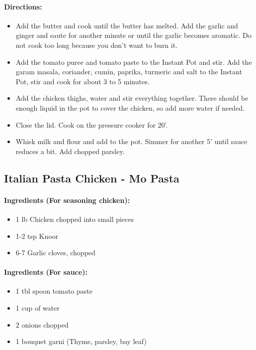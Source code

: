 \documentclass{article}
\begin{document}
\paragraph{Directions:}
\begin{itemize}
    \item Add the butter and cook until the butter has melted. Add the garlic and ginger and saute for another minute or until the garlic becomes aromatic. Do not cook too long because you don’t want to burn it.
    \item Add the tomato puree and tomato paste to the Instant Pot and stir. Add the garam masala, coriander, cumin, paprika, turmeric and salt to the Instant Pot, stir and cook for about 3 to 5 minutes.
    \item Add the chicken thighs, water and stir everything together. There should be enough liquid in the pot to cover the chicken, so add more water if needed.
    \item Close the lid. Cook on the pressure cooker for 20’.
    \item Whisk milk and flour and add to the pot. Simmer for another 5’ until sauce reduces a bit. Add chopped parsley.
\end{itemize}

\subsection{Italian Pasta Chicken - Mo Pasta} 

\paragraph{Ingredients (For seasoning chicken):}
\begin{itemize}
    \item 1 lb Chicken chopped into small pieces
    \item 1-2 tsp Knoor
    \item 6-7 Garlic cloves, chopped
\end{itemize}  

\paragraph{Ingredients (For sauce):}
\begin{itemize}
    \item 1 tbl spoon tomato paste
    \item 1 cup of water
    \item 2 onions chopped
    \item 1 bouquet garni (Thyme, parsley, bay leaf)
\end{itemize}  
\end{document}
